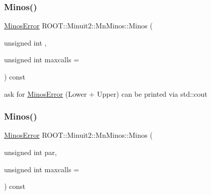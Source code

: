 \subsubsection{\texorpdfstring{Minos()}{Minos()}\hspace{0.1cm}{\footnotesize\ttfamily [2/3]}}
{\footnotesize\ttfamily \mbox{\hyperlink{classROOT_1_1Minuit2_1_1MinosError}{Minos\+Error}} R\+O\+O\+T\+::\+Minuit2\+::\+Mn\+Minos\+::\+Minos (\begin{DoxyParamCaption}\item[{unsigned int}]{,  }\item[{unsigned int}]{maxcalls = {} }\end{DoxyParamCaption}) const}

ask for \mbox{\hyperlink{classROOT_1_1Minuit2_1_1MinosError}{Minos\+Error}} (Lower + Upper) can be printed via std\+::cout \mbox{\label{classROOT_1_1Minuit2_1_1MnMinos_aeb1fe39f5851b5af050191d812d21723}} 
\subsubsection{\texorpdfstring{Minos()}{Minos()}\hspace{0.1cm}{\footnotesize\ttfamily [3/3]}}
{\footnotesize\ttfamily \mbox{\hyperlink{classROOT_1_1Minuit2_1_1MinosError}{Minos\+Error}} R\+O\+O\+T\+::\+Minuit2\+::\+Mn\+Minos\+::\+Minos (\begin{DoxyParamCaption}\item[{unsigned int}]{par,  }\item[{unsigned int}]{maxcalls = {} }\end{DoxyParamCaption}) const}

